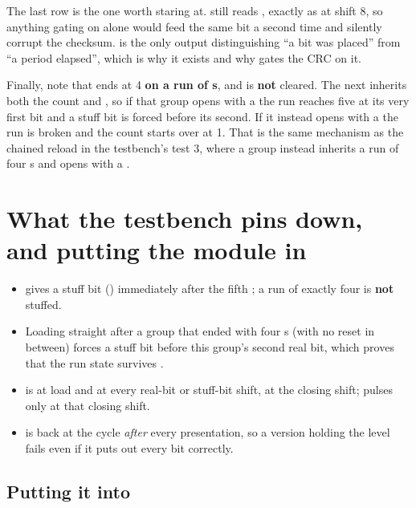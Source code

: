 The last row is the one worth staring at.  still reads , exactly as at shift
8, so anything gating on  alone would feed  the same bit a second time and
silently corrupt the checksum.  is the only output distinguishing ``a bit was placed''
from ``a period elapsed'', which is why it exists and why  gates the CRC on it.

Finally, note that  ends at 4 \textbf{on a run of s}, and is \textbf{not}
cleared. The next  inherits both the count and , so if that group opens with
a  the run reaches five at its very first bit and a stuff bit is forced before its second.
If it instead opens with a  the run is broken and the count starts over at 1. That is the
same mechanism as the chained reload in the testbench's test 3, where a group instead inherits a run
of four s and opens with a .

\section{What the testbench pins down, and putting the module in}
\label{c14:sec:tb}

\begin{itemize}
  \item {} gives a stuff bit () immediately after the fifth ; a
    run of exactly four is \textbf{not} stuffed.
  \item Loading  straight after a group that ended with four s (with no
    reset in between) forces a stuff bit before this group's second real bit, which proves that the
    run state survives .
  \item {} is  at load and at every real-bit or stuff-bit shift, 
    at the closing shift;  pulses only at that closing shift.
  \item {} is back at  the cycle \emph{after} every presentation, so a version
    holding the level fails even if it puts out every bit correctly.
\end{itemize}

\subsection{Putting it into }
\label{c14:sub:wire}

